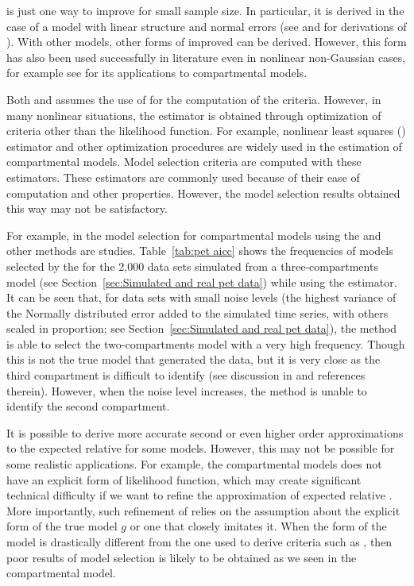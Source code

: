 \aicc is just one way to improve \aic for small sample size. In particular, it
is derived in the case of a model with linear structure and normal errors (see
\cite{Hurvich:1989ev} and \cite[][sec.~6.4.1]{Burnham:2002wc} for derivations
of \aicc). With other models, other forms of improved \aic can be derived.
However, this form has also been used successfully in literature even in
nonlinear non-Gaussian cases, for example see \cite{Turkheimer:2003iy} for its
applications to \pet compartmental models.

Both \aic and \aicc assumes the use of \mle for the computation of the
criteria. However, in many nonlinear situations, the estimator is obtained
through optimization of criteria other than the likelihood function. For
example, nonlinear least squares (\nls) estimator and other optimization
procedures are widely used in the estimation of \pet compartmental models.
Model selection criteria are computed with these estimators. These estimators
are commonly used because of their ease of computation and other properties.
However, the model selection results obtained this way may not be
satisfactory.



For example, in \cite{Zhou2013} the model selection for \pet compartmental
models using the \aic and other methods are studies. Table~\ref{tab:pet aicc}
shows the frequencies of models selected by the \aicc for the 2,000 data sets
simulated from a three-compartments model (see Section~\ref{sec:Simulated and
  real pet data}) while using the \nls estimator. It can be seen that, for
data sets with small noise levels (the highest variance of the Normally
distributed error added to the simulated time series, with others scaled in
proportion; see Section~\ref{sec:Simulated and real pet data}), the \aicc
method is able to select the two-compartments model with a very high
frequency. Though this is not the true model that generated the data, but it
is very close as the third compartment is difficult to identify (see
discussion in \cite{Zhou2013} and references therein). However, when the noise
level increases, the method is unable to identify the second compartment.

It is possible to derive more accurate second or even higher order
approximations to the expected relative \kld for some models. However, this
may not be possible for some realistic applications. For example, the \pet
compartmental models does not have an explicit form of likelihood function,
which may create significant technical difficulty if we want to refine the
\aic approximation of expected relative \kld. More importantly, such
refinement of \aic relies on the assumption about the explicit form of the
true model $g$ or one that closely imitates it. When the form of the model is
drastically different from the one used to derive criteria such as \aicc, then
poor results of model selection is likely to be obtained as we seen in the
\pet compartmental model.

